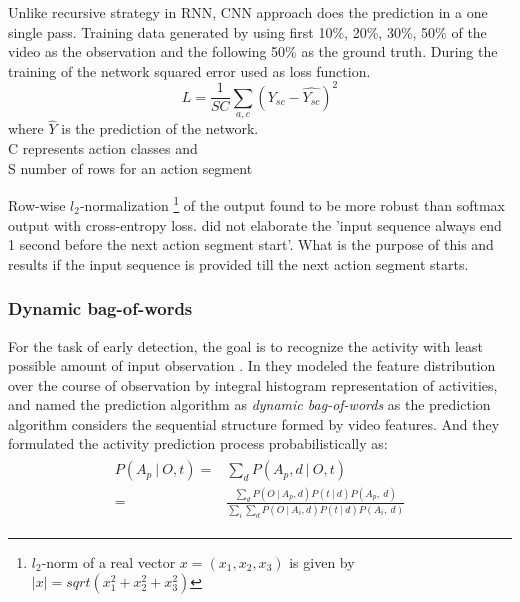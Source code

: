 \newpara Unlike recursive strategy in RNN, CNN approach does the prediction in a one single pass.
Training data generated by using first 10\%, 20\%, 30\%, 50\% of the video as the observation and the following 50\% as the ground truth. During the training of the network squared error used as loss function.
\begin{equation}
    L = \frac{1} {SC} \sum_{a,c} (Y_{sc} - \hat{Y_{sc}})^2 
\end{equation}
where $\hat{Y}$ is the prediction of the network. \\
C represents action classes and \\
S number of rows for an action segment

\newpara Row-wise $\textit{l}_2$-normalization \footnote{$l_2$-norm of a real vector $x=(x_1,x_2,x_3)$ is given by $|x|=sqrt(x_1^2+x_2^2+x_3^2)$} of the output found to be more robust than softmax output with cross-entropy loss. \cite{abu2018will} did not elaborate the 'input sequence always end 1 second before the next action segment start'. What is the purpose of this and results if the input sequence is provided till the next action segment starts.

\subsubsection{Dynamic bag-of-words} 
For the task of early detection, the goal is to recognize the activity with least possible amount of input observation \cite{ryoo2011human}. In \cite{ryoo2011human} they modeled the feature distribution over the course of observation by integral histogram representation of activities, and named the prediction algorithm as \textit{dynamic bag-of-words} as the prediction algorithm considers the sequential structure formed by video features. And they formulated the activity prediction process probabilistically as:
\begin{align}
\begin{split}
		P(A_{p}\: |\: O,t) ={}& \displaystyle \sum_{d}  P(A_{p},d\: |\: O,t)\\
		={}&	\frac{\sum_{d} P(O\: | \: A_{p},d)P(t\: | \:d)P(A_{p},\: d)}
	 {\sum_{i}\sum_{d} P(O\: | \: A_{i},d)P(t\: | \:d)P(A_{i},\: d) }
\end{split}
\end{align}

